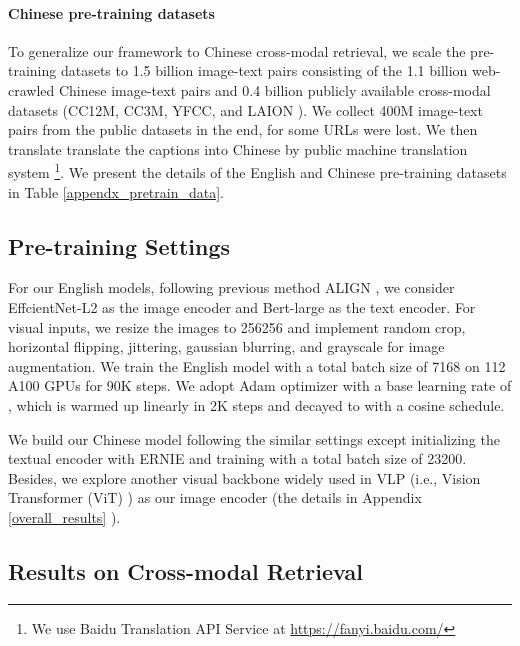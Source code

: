\documentclass{article}
\begin{document}
\paragraph{Chinese pre-training datasets} To generalize our framework to Chinese cross-modal retrieval, we scale the pre-training datasets to 1.5 billion image-text pairs consisting of the 1.1 billion web-crawled Chinese image-text pairs and 0.4 billion publicly available cross-modal datasets (CC12M, CC3M, YFCC, and LAION\cite{schuhmann2021laion400m} ). We collect 400M image-text pairs from the public datasets in the end, for some URLs were lost. We then translate translate the captions into Chinese by public machine translation system \footnote{We use Baidu Translation API Service at \url{https://fanyi.baidu.com/}}.
We present the details of the English and Chinese pre-training datasets in Table \ref{appendx_pretrain_data}.

\subsection{Pre-training Settings}
\label{settings}
For our English models, following previous method ALIGN \cite{Jia2021ScalingUV}, we consider EffcientNet-L2\cite{pmlr-v97-tan19a} as the image encoder and Bert-large \cite{devlin-etal-2019-bert} as the text encoder. For visual inputs, we resize the images to 256256 and implement random crop, horizontal flipping, jittering, gaussian blurring, and grayscale for image augmentation. We train the English model with a total batch size of 7168 on 112 A100 GPUs for 90K steps. We adopt Adam optimizer \cite{DBLP:journals/corr/KingmaB14} with a base learning rate of , which is warmed up linearly in 2K steps and decayed to  with a cosine schedule. 

We build our Chinese model following the similar settings except initializing the textual encoder with ERNIE \cite{sun2019ernie,sun2020ernie,sun2021ernie} and training with a total batch size of 23200. Besides, we explore another visual backbone widely used in VLP (i.e., Vision Transformer (ViT) \cite{dosovitskiy2021an}) as our image encoder (the details in Appendix \ref{overall_results} ).
\subsection{Results on Cross-modal Retrieval}
\label{Cross_modal_Retrieval}
\end{document}

